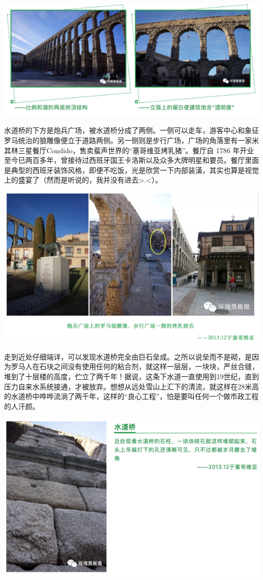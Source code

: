 \documentclass[]{book}
\begin{document}
\includegraphics[width=8.33in]{images/xt45}

水道桥的下方是炮兵广场，被水道桥分成了两侧。一侧可以走车，游客中心和象征罗马统治的狼雕像便立于道路两侧。另一侧则是步行广场，广场的角落里有一家米其林三星餐厅Condido，售卖蜚声世界的``塞哥维亚烤乳猪''。餐厅自
1786
年开业至今已两百多年，曾接待过西班牙国王卡洛斯以及众多大牌明星和要员。餐厅里面是典型的西班牙装饰风格，即便不吃饭，光是欣赏一下内部装潢，其实也算是视觉上的盛宴了（然而是听说的，我并没有进去\textgreater{}.\textless{}）。

\includegraphics[width=8.33in]{images/xt46}

走到近处仔细端详，可以发现水道桥完全由巨石垒成。之所以说垒而不是砌，是因为罗马人在石块之间没有使用任何的粘合剂，就这样一层层，一块块，严丝合缝，堆到了十层楼的高度，伫立了两千年！据说，这条下水道一直使用到19世纪，直到压力自来水系统接通，才被放弃。想想从远处雪山上汇下的清流，就这样在28米高的水道桥中哗哗流淌了两千年，这样的``良心工程''，怕是要叫任何一个做市政工程的人汗颜。

\includegraphics[width=8.33in]{images/xt47}
\end{document}
